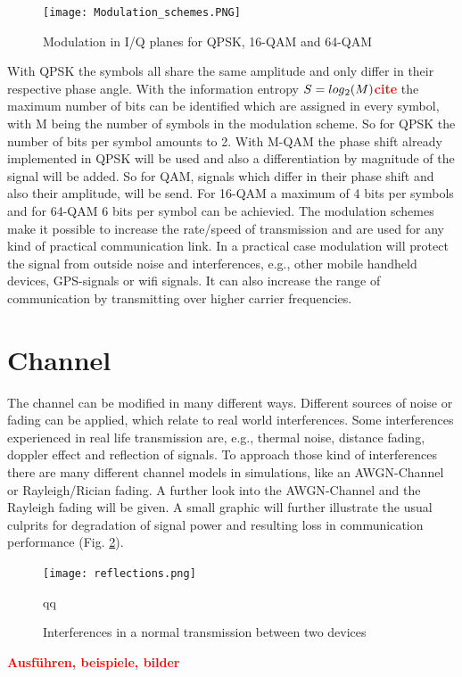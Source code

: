 \documentclass[12pt,oneside, reqno]{report}
\newcommand\boldred[1]{\textcolor{red}{\textbf{#1}}}
\begin{document}
\begin{figure}[H]
	\centering
	\texttt{[image: Modulation\_schemes.PNG]}
	\caption{Modulation in I/Q planes for QPSK, 16-QAM and 64-QAM}
	\label{fig:Modulation}
\end{figure}

With \gls{QPSK} the symbols all share the same amplitude and only differ in their respective phase angle. With the information entropy $S = log\textsubscript{2}(M)$\boldred{cite} the maximum number of bits can be identified which are assigned in every symbol, with M being the number of symbols in the modulation scheme. So for \gls{QPSK} the number of bits per symbol amounts to 2.
\newline
With M-\gls{QAM}  the phase shift  already implemented in \gls{QPSK} will be used and also a differentiation by magnitude of the signal will be added. So for \gls{QAM}, signals which differ in their phase shift and also their amplitude, will be send.  For 16-\gls{QAM} a maximum of 4 bits per symbols and for 64-\gls{QAM} 6 bits per symbol can be achievied.
\newline
The modulation schemes make it possible to increase the rate/speed of transmission and are used for any kind of practical communication link. In a practical case modulation will protect the signal from outside noise and interferences, e.g., other mobile handheld devices, GPS-signals or wifi signals. It can also increase the range of communication by transmitting over higher carrier frequencies. 

\section{Channel}
\label{sec:channel}
The channel can be modified in many different ways. Different sources of noise or fading can be applied, which relate to real world interferences. Some interferences experienced in real life transmission are, e.g., thermal noise, distance fading, doppler effect and reflection of signals. To approach those kind of interferences there are many different channel models in simulations, like an \gls{AWGN}-Channel or Rayleigh/Rician fading. A further look into the \gls{AWGN}-Channel and the Rayleigh fading will be given. A small graphic will further illustrate the usual culprits for degradation of signal power and resulting loss in communication performance (Fig. \ref{fig:interferences}).
\newline
\begin{figure}[H]
	\centering
	\texttt{[image: reflections.png]}
	\caption{Interferences in a normal transmission between two devices}qq
	\label{fig:interferences}
\end{figure}
\boldred{Ausführen, beispiele, bilder}
\newpage
\end{document}

